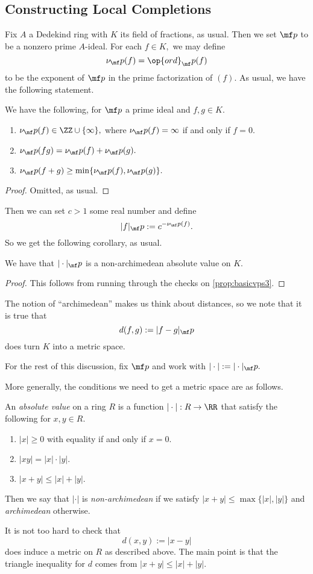 \documentclass[../notes.tex]{subfiles}
\begin{document}
\subsection{Constructing Local Completions}
Fix $A$ a Dedekind ring with $K$ its field of fractions, as usual. Then we set $\mf p$ to be a nonzero prime $A$-ideal. For each $f\in K,$ we may define
\[\nu_\mf p(f)=\op{ord}_\mf p(f)\]
to be the exponent of $\mf p$ in the prime factorization of $(f).$ As usual, we have the following statement.
\begin{proposition} \label{prop:basicvps3}
	We have the following, for $\mf p$ a prime ideal and $f,g\in K.$
	\begin{enumerate}[label=(\alph*)]
		\item $\nu_\mf p(f)\in\ZZ\cup\{\infty\},$ where $\nu_\mf p(f)=\infty$ if and only if $f=0.$
		\item $\nu_\mf p(fg)=\nu_\mf p(f)+\nu_\mf p(g).$
		\item $\nu_\mf p(f+g)\ge\min\{\nu_\mf p(f),\nu_\mf p(g)\}.$
	\end{enumerate}
\end{proposition}
\begin{proof}
	Omitted, as usual.
\end{proof}
Then we can set $c>1$ some real number and define
\[|f|_\mf p:=c^{-\nu_\mf p(f)}.\]
So we get the following corollary, as usual.
\begin{corollary}
	We have that $|\cdot|_\mf p$ is a non-archimedean absolute value on $K.$
\end{corollary}
\begin{proof}
	This follows from running through the checks on \autoref{prop:basicvps3}.
\end{proof}
The notion of ``archimedean'' makes us think about distances, so we note that it is true that
\[d(f,g):=|f-g|_\mf p\]
does turn $K$ into a metric space.
\begin{warn}
	For the rest of this discussion, fix $\mf p$ and work with $|\cdot|:=|\cdot|_\mf p.$
\end{warn}
More generally, the conditions we need to get a metric space are as follows.
\begin{definition}
	An \textit{absolute value} on a ring $R$ is a function $|\cdot|:R\to\RR$ that satisfy the following for $x,y\in R.$
	\begin{enumerate}[label=(\alph*)]
		\item $|x|\ge0$ with equality if and only if $x=0.$
		\item $|xy|=|x|\cdot|y|.$
		\item $|x+y|\le|x|+|y|.$
	\end{enumerate}
	Then we say that $|\cdot|$ is \textit{non-archimedean} if we satisfy $|x+y|\le\max\{|x|,|y|\}$ and \textit{archimedean} otherwise.
\end{definition}
It is not too hard to check that
\[d(x,y):=|x-y|\]
does induce a metric on $R$ as described above. The main point is that the triangle inequality for $d$ comes from $|x+y|\le|x|+|y|.$
\end{document}

